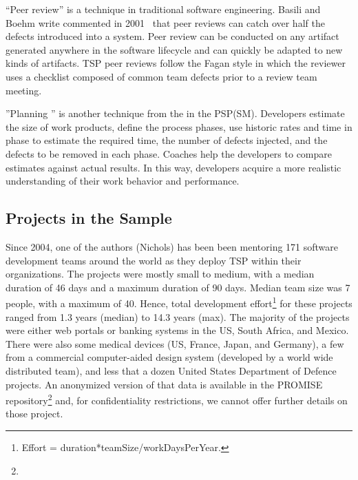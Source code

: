   
 
``Peer review'' is a  technique in
traditional software engineering.
 Basili and Boehm write  commented in 2001~\cite{boehm01} 
that peer reviews can catch over half the defects introduced into a system.
Peer review can be conducted on any artifact generated anywhere in the software
lifecycle and can quickly be adapted to new kinds of artifacts. TSP peer reviews follow the Fagan style in which the reviewer uses a checklist composed of common team defects prior to a review team meeting. 


''Planning '' is another technique from the in the PSP(SM). Developers estimate the size of work products, define the process phases, use historic rates and time in phase to estimate the required time, the number of defects injected, and the defects to be removed in each phase. Coaches help the developers to compare estimates against actual results. In this way, developers acquire a more realistic understanding of their work behavior and performance.



\subsection{Projects in the Sample}
Since 2004, one of the authors (Nichols) has been been mentoring 171 software development teams around the world as they deploy TSP within their organizations.  
The projects
were mostly small to medium, with a median duration of 46 days
and a maximum duration of 90 days. Median team size was 7
people, with a maximum of 40. Hence,  total development 
effort\footnote{
Effort =  duration*teamSize/workDaysPerYear.} for
these projects ranged from 1.3 years (median) to 14.3 years (max).
The majority of
the projects were either web portals or banking systems in the US, South Africa, and Mexico. 
There were also some  medical devices (US, France, Japan, and Germany),  a few from a commercial 
computer-aided design system (developed by a world wide distributed team), and less that  
a dozen United States
Department of Defence projects.
 An anonymized version of that data is available in the PROMISE repository\footnote{} and,
 for confidentiality restrictions, we cannot offer 
further details
on those project.  

